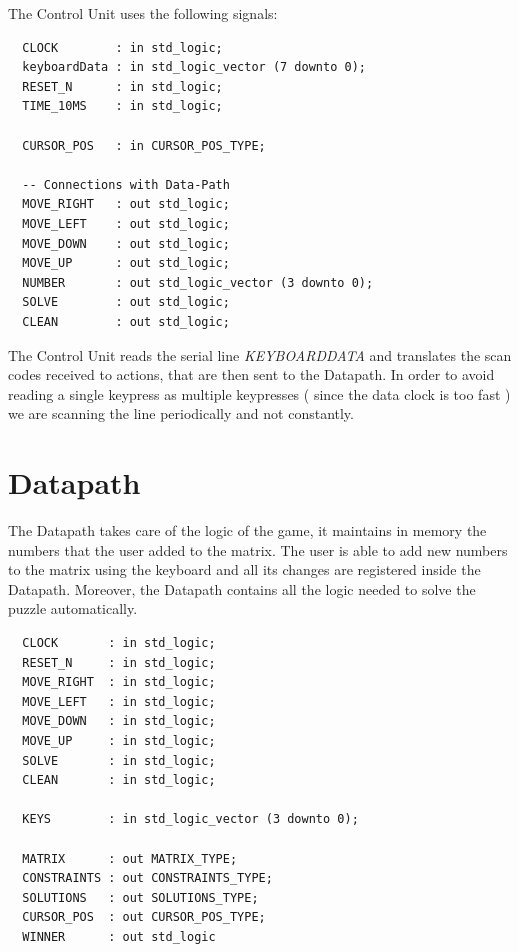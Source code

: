 \documentclass[12pt]{report}
\begin{document}
The Control Unit uses the following signals:

\begin{center}
\begin{minipage}{0.5\textwidth}
\begin{verbatim}
  CLOCK        : in std_logic;
  keyboardData : in std_logic_vector (7 downto 0);
  RESET_N      : in std_logic;
  TIME_10MS    : in std_logic;

  CURSOR_POS   : in CURSOR_POS_TYPE;

  -- Connections with Data-Path
  MOVE_RIGHT   : out std_logic;
  MOVE_LEFT    : out std_logic;
  MOVE_DOWN    : out std_logic;
  MOVE_UP      : out std_logic;
  NUMBER       : out std_logic_vector (3 downto 0);
  SOLVE        : out std_logic;
  CLEAN        : out std_logic;
\end{verbatim}
\end{minipage}
\end{center}

The Control Unit reads the serial line \textit{KEYBOARDDATA} and
translates the scan codes received to actions, that are then sent to the
Datapath. In order to avoid reading a single keypress as multiple
keypresses ( since the data clock is too fast ) we are scanning the line
periodically and not constantly.

\newpage

\section*{Datapath}

The Datapath takes care of the logic of the game, it maintains in memory
the numbers that the user added to the matrix. The user is able to add new
numbers to the matrix using the keyboard and all its changes are registered
inside the Datapath. Moreover, the Datapath contains all the logic needed to
solve the puzzle automatically.

\begin{center}
\begin{minipage}{0.5\textwidth}
\begin{verbatim}
  CLOCK       : in std_logic;
  RESET_N     : in std_logic;
  MOVE_RIGHT  : in std_logic;
  MOVE_LEFT   : in std_logic;
  MOVE_DOWN   : in std_logic;
  MOVE_UP     : in std_logic;
  SOLVE       : in std_logic;
  CLEAN       : in std_logic;

  KEYS        : in std_logic_vector (3 downto 0);

  MATRIX      : out MATRIX_TYPE;
  CONSTRAINTS : out CONSTRAINTS_TYPE;
  SOLUTIONS   : out SOLUTIONS_TYPE;
  CURSOR_POS  : out CURSOR_POS_TYPE;
  WINNER      : out std_logic
\end{verbatim}
\end{minipage}
\end{center}
\end{document}
